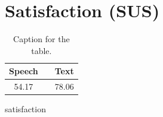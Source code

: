 \section{Satisfaction (SUS)}

\begin{table}[h!]
  \centering
  \label{tab:table1}
  \begin{tabular}{ccc}
    \toprule
    Speech &   & Text\\
    \midrule
    54.17 &   & 78.06\\
    \bottomrule
  \end{tabular}
  \caption{Caption for the table.}
\end{table}

satisfaction